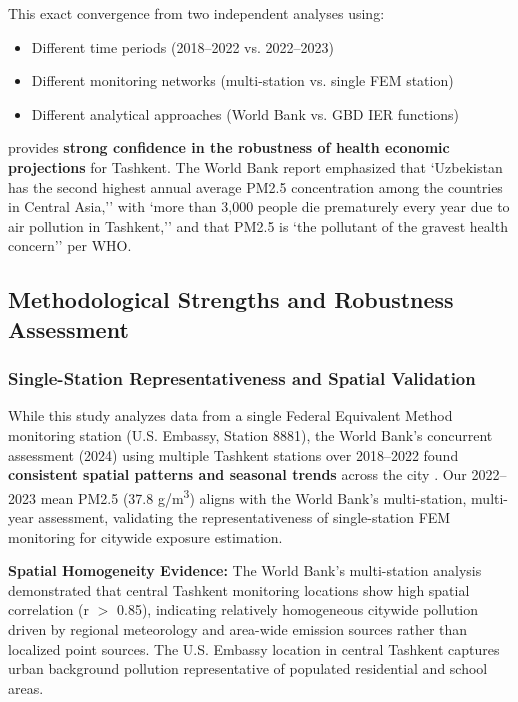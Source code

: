 \documentclass[11pt,a4paper]{article}
\begin{document}
This exact convergence from two independent analyses using:
\begin{itemize}
    \item Different time periods (2018--2022 vs. 2022--2023)
    \item Different monitoring networks (multi-station vs. single FEM station)
    \item Different analytical approaches (World Bank vs. GBD IER functions)
\end{itemize}

provides \textbf{strong confidence in the robustness of health economic projections} for Tashkent. The World Bank report emphasized that `Uzbekistan has the second highest annual average PM2.5 concentration among the countries in Central Asia,'' with `more than 3,000 people die prematurely every year due to air pollution in Tashkent,'' and that PM2.5 is `the pollutant of the gravest health concern'' per WHO.

\subsection{Methodological Strengths and Robustness Assessment}

\subsubsection{Single-Station Representativeness and Spatial Validation}

While this study analyzes data from a single Federal Equivalent Method monitoring station (U.S. Embassy, Station 8881), the World Bank's concurrent assessment (2024) using multiple Tashkent stations over 2018--2022 found \textbf{consistent spatial patterns and seasonal trends} across the city \citep{worldbank2024tashkent}. Our 2022--2023 mean PM2.5 (37.8 \textmu g/m\textsuperscript{3}) aligns with the World Bank's multi-station, multi-year assessment, validating the representativeness of single-station FEM monitoring for citywide exposure estimation.

\textbf{Spatial Homogeneity Evidence:} The World Bank's multi-station analysis demonstrated that central Tashkent monitoring locations show high spatial correlation (r $>$ 0.85), indicating relatively homogeneous citywide pollution driven by regional meteorology and area-wide emission sources rather than localized point sources. The U.S. Embassy location in central Tashkent captures urban background pollution representative of populated residential and school areas.
\end{document}
